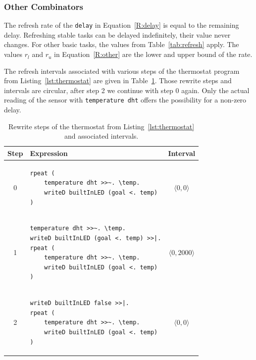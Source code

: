 \documentclass[runningheads]{llncs}
\newcommand{\CleanInline}[1]{\lstinline[language=Clean]!#1!}
\newcommand{\prog}[1]{\CleanInline{#1}}
\begin{document}
\subsubsection{Other Combinators} The refresh rate of the \prog{delay} in Equation~\ref{R:delay} is equal to the remaining delay.
Refreshing stable tasks can be delayed indefinitely, their value never changes.
For other basic tasks, the values from Table~\ref{tab:refresh} apply.
The values $r_l$ and $r_u$ in Equation~\ref{R:other} are the lower and upper bound of the rate.

The refresh intervals associated with various steps of the thermostat program from Listing~\ref{lst:thermostat} are given in Table~\ref{tab:intervals}.
Those rewrite steps and intervals are circular, after step 2 we continue with step 0 again.
Only the actual reading of the sensor with \prog{temperature dht} offers the possibility for a non-zero delay.

\begin{table}[ht]
	\begin{center}
		\begin{tabular}{  c p{}  c }
			\toprule
			Step & Expression & Interval \\
			\midrule
			0  &
			\vspace{-.4cm}
			\begin{lstlisting}
rpeat (
    temperature dht >>~. \temp.
    writeD builtInLED (goal <. temp)
)
			\end{lstlisting}
			   &
			   $\langle 0, 0 \rangle$ \\ [-1.5em]
			1  &
			\vspace{-.4cm}
			\begin{lstlisting}[boxpos=t]
temperature dht >>~. \temp.
writeD builtInLED (goal <. temp) >>|.
rpeat (
    temperature dht >>~. \temp.
    writeD builtInLED (goal <. temp)
)
			\end{lstlisting}
			   & $\langle 0, 2000 \rangle$ \\ [-1.5em]
			2  &
			\vspace{-.4cm}
			\begin{lstlisting}
writeD builtInLED false >>|.
rpeat (
    temperature dht >>~. \temp.
    writeD builtInLED (goal <. temp)
)
			\end{lstlisting}
			& $\langle 0, 0 \rangle$ \\[-1.5em]
			\bottomrule
		\end{tabular}
	\end{center}
	\caption{Rewrite steps of the thermostat from Listing~\ref{lst:thermostat} and associated intervals.}%
	\label{tab:intervals}
\end{table}
\end{document}
